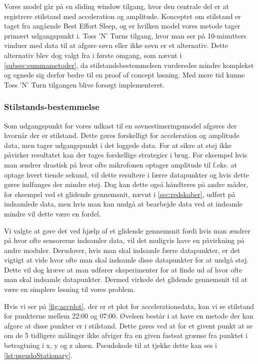 Vores model går på en sliding window tilgang, hvor den centrale del er at registrere stilstand med acceleration og amplitude.
Konceptet om stilstand er taget fra \citet{6563918} angående Best Effort Sleep, og er hvilken model vores metode tager primært udgangspunkt i.
Toss 'N' Turns tilgang, hvor man ser på 10-minutters vinduer med data til at afgøre søvn eller ikke søvn er et alternativ.
Dette alternativ blev dog valgt fra i første omgang, som nævnt i \cref{subsec:summametoder}, da stilstandsbestemmelsen vurderedes mindre komplekst og egnede sig derfor bedre til en proof of concept løsning.
Med mere tid kunne Toss 'N' Turn tilgangen blive forsøgt implementeret.

\subsubsection{Stilstands-bestemmelse}
Som udgangspunkt for vores udkast til en søvnestimeringsmodel afgøres der hvornår der er stilstand.
Dette gøres forskelligt for acceleration og amplitude data, men tager udgangspunkt i det loggede data.
For at sikre at støj ikke påvirker resultatet kan der tages forskellige strategier i brug. 
For eksempel hvis man ændrer drastisk på hvor ofte mikrofonen optager amplitude til f.eks. at optage hvert tiende sekund, vil dette resultere i færre datapunkter og hvis dette gøres indfanges der mindre støj.
Dog kan dette også håndteres på andre måder, for eksempel ved et glidende gennemsnit, nævnt i \cref{sec:redskaber}, udført på indsamlede data, men hvis man kan undgå at bearbejde data ved at indsamle mindre vil dette være en fordel.

Vi valgte at gøre det ved hjælp af et glidende gennemsnit fordi hvis man ændrer på hvor ofte sensorerne indsamler data, vil det muligvis have en påvirkning på andre moduler.
Derudover, hvis man skal indsamle færre datapunkter, er det vigtigt at vide hvor ofte man skal indsamle disse datapunkter for at undgå støj.
Dette vil dog kræve at man udfører eksperimenter for at finde ud af hvor ofte man skal indsamle datapunkter.
Dermed virkede det glidende gennemsnit til at være en simplere løsning til vores problem.

Hvis vi ser på \cref{fig:accplot}, der er et plot for accelerationsdata, kan vi se stilstand for punkterne mellem 22:00 og 07:00.
Øvelsen består i at have en metode der kan afgøre at disse punkter er i stilstand.
Dette gøres ved at for et givent punkt at se om de 5 tidligere målinger ikke afviger fra en given fastsat grænse fra punktet i betragtning i x, y og z aksen.
Pseudokode til at tjekke dette kan ses i \cref{lst:pseudoStationary}.

